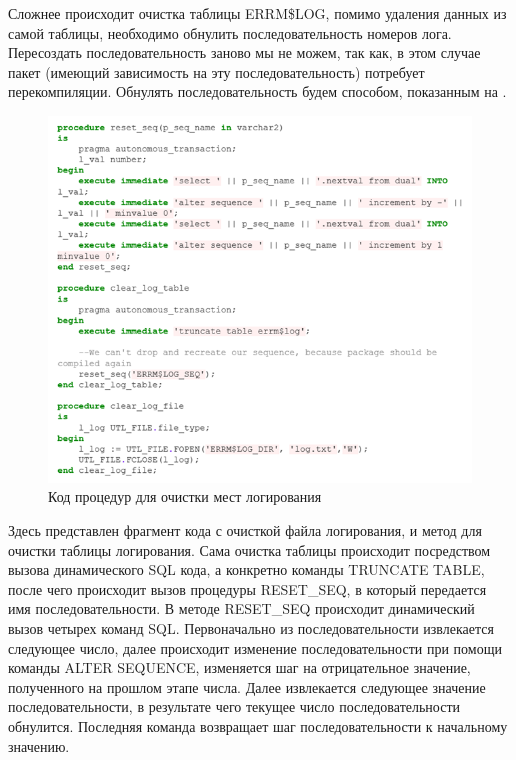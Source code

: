 Сложнее происходит очистка таблицы ERRM\$LOG, помимо удаления данных из самой таблицы, необходимо обнулить последовательность номеров лога. Пересоздать последовательность заново мы не можем, так как, в этом случае пакет (имеющий зависимость на эту последовательность) потребует перекомпиляции. Обнулять последовательность будем способом, показанным на . 

\begin{figure}[ht!] 
	\center
	\includegraphics [scale=1] {my_folder/img/c3_clear_code.png}
	\caption{Код процедур для очистки мест логирования} 
	\label{fig:c3_clear_code}  
\end{figure}
\FloatBarrier

Здесь представлен фрагмент кода с очисткой файла логирования, и метод для очистки таблицы логирования. Сама очистка таблицы происходит посредством вызова динамического SQL кода, а конкретно команды TRUNCATE TABLE, после чего происходит вызов процедуры RESET\_SEQ, в который передается имя последовательности. 
В методе RESET\_SEQ происходит динамический вызов четырех команд SQL. Первоначально из последовательности извлекается следующее число, далее происходит изменение последовательности при помощи команды ALTER SEQUENCE, изменяется шаг на отрицательное значение, полученного на прошлом этапе числа. Далее извлекается следующее значение последовательности, в результате чего текущее число последовательности обнулится. Последняя команда возвращает шаг последовательности к начальному значению. 


